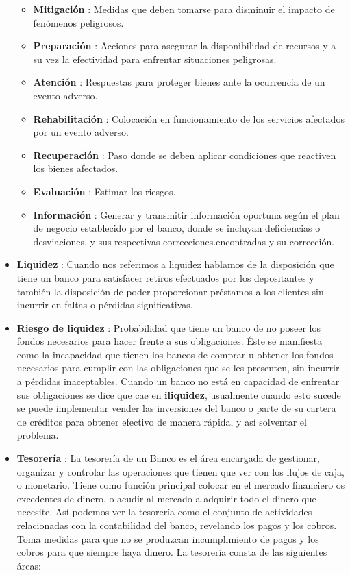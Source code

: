 \documentclass[]{article}
\providecommand{\tightlist}{%
  \setlength{\itemsep}{0pt}\setlength{\parskip}{0pt}}
\begin{document}
\begin{itemize}
  \begin{itemize}
  \tightlist
  \item
    \textbf{Mitigación} : Medidas que deben tomarse para disminuir el
    impacto de fenómenos peligrosos.
  \item
    \textbf{Preparación} : Acciones para asegurar la disponibilidad de
    recursos y a su vez la efectividad para enfrentar situaciones
    peligrosas.
  \item
    \textbf{Atención} : Respuestas para proteger bienes ante la
    ocurrencia de un evento adverso.
  \item
    \textbf{Rehabilitación} : Colocación en funcionamiento de los
    servicios afectados por un evento adverso.
  \item
    \textbf{Recuperación} : Paso donde se deben aplicar condiciones que
    reactiven los bienes afectados.
  \item
    \textbf{Evaluación} : Estimar los riesgos.
  \item
    \textbf{Información} : Generar y transmitir información oportuna
    según el plan de negocio establecido por el banco, donde se incluyan
    deficiencias o desviaciones, y sus respectivas
    correcciones.encontradas y su corrección.
  \end{itemize}
\item
  \textbf{Liquidez} : Cuando nos referimos a liquidez hablamos de la
  disposición que tiene un banco para satisfacer retiros efectuados por
  los depositantes y también la disposición de poder proporcionar
  préstamos a los clientes sin incurrir en faltas o pérdidas
  significativas.
\item
  \textbf{Riesgo de liquidez} : Probabilidad que tiene un banco de no
  poseer los fondos necesarios para hacer frente a sus obligaciones.
  Éste se manifiesta como la incapacidad que tienen los bancos de
  comprar u obtener los fondos necesarios para cumplir con las
  obligaciones que se les presenten, sin incurrir a pérdidas
  inaceptables. Cuando un banco no está en capacidad de enfrentar sus
  obligaciones se dice que cae en \textbf{iliquidez}, usualmente cuando
  esto sucede se puede implementar vender las inversiones del banco o
  parte de su cartera de créditos para obtener efectivo de manera
  rápida, y así solventar el problema.
\item
  \textbf{Tesorería} : La tesorería de un Banco es el área encargada de
  gestionar, organizar y controlar las operaciones que tienen que ver
  con los flujos de caja, o monetario. Tiene como función principal
  colocar en el mercado financiero os excedentes de dinero, o acudir al
  mercado a adquirir todo el dinero que necesite. Así podemos ver la
  tesorería como el conjunto de actividades relacionadas con la
  contabilidad del banco, revelando los pagos y los cobros. Toma medidas
  para que no se produzcan incumplimiento de pagos y los cobros para que
  siempre haya dinero. La tesorería consta de las siguientes áreas:


\end{itemize}
\end{document}

